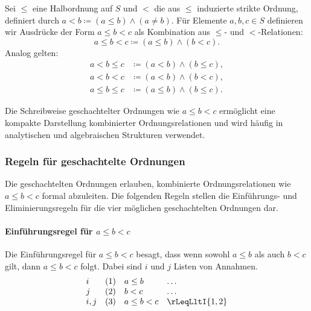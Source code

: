 \documentclass[main.tex]{subfiles}
\begin{document}
\begin{definition}
    Sei \(\leq\) eine Halbordnung auf \(S\) und \(<\) die aus \(\leq\) induzierte strikte Ordnung, definiert durch \( a < b \coloneqq (a \leq b) \land (a \neq b) \). Für Elemente \(a, b, c \in S\) definieren wir Ausdrücke der Form \(a \leq b < c\) als Kombination aus \(\leq\)- und \(<\)-Relationen:
    \[
    a \leq b < c \coloneqq (a \leq b) \land (b < c).
    \]
    Analog gelten:
    \begin{align*}
        a < b \leq c &\coloneqq (a < b) \land (b \leq c), \\
        a < b < c &\coloneqq (a < b) \land (b < c), \\
        a \leq b \leq c &\coloneqq (a \leq b) \land (b \leq c).
    \end{align*}
\end{definition}

\begin{remark}
    Die Schreibweise geschachtelter Ordnungen wie \(a \leq b < c\) ermöglicht eine kompakte Darstellung kombinierter Ordnungsrelationen und wird häufig in analytischen und algebraischen Strukturen verwendet.
\end{remark}

\subsubsection{Regeln für geschachtelte Ordnungen}
\label{rule:rLeqLltE} \label{rule:rLeqLltI}
\label{rule:rLltLeqE} \label{rule:rLltLeqI}
\label{rule:rLltLltE} \label{rule:rLltLltI}
\label{rule:rLeqLeqE} \label{rule:rLeqLeqI}

Die geschachtelten Ordnungen erlauben, kombinierte Ordnungsrelationen wie \(a \leq b < c\) formal abzuleiten. Die folgenden Regeln stellen die Einführungs- und Eliminierungsregeln für die vier möglichen geschachtelten Ordnungen dar.

\paragraph{Einführungsregel für \(a \leq b < c\)}
Die Einführungsregel für \(a \leq b < c\) besagt, dass wenn sowohl \(a \leq b\) als auch \(b < c\) gilt, dann \(a \leq b < c\) folgt. Dabei sind \(i\) und \(j\) Listen von Annahmen.
\[
\begin{array}{llll}
    i   & (1) & a \leq b & \dots \\
    j   & (2) & b < c & \dots \\
    i,j & (3) & a \leq b < c & \rLeqLltI{1,2}
\end{array}
\]
\end{document}
